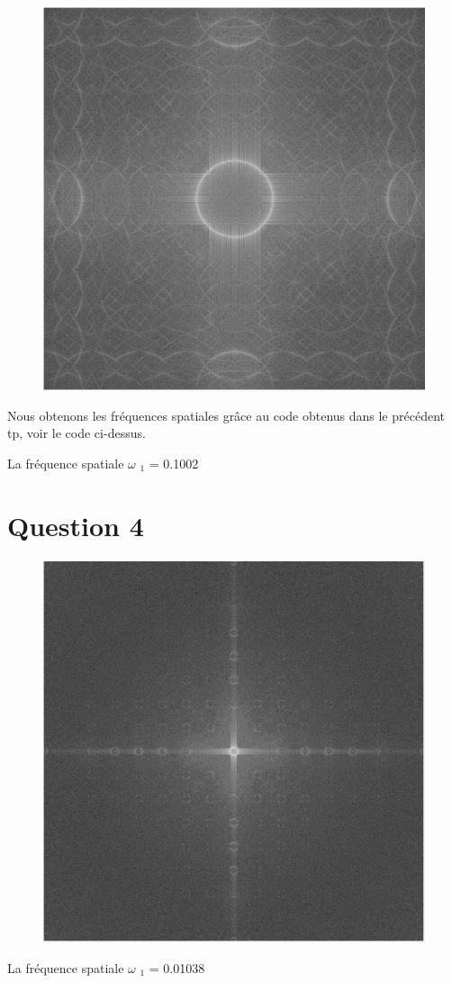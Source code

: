 \documentclass[a4paper,12pt]{report}
\begin{document}
\begin{figure}[!ht]
	\center	
		\includegraphics[scale=0.1]{image/q3.png}		
\end{figure}
Nous obtenons les fréquences spatiales grâce au code obtenus dans le précédent tp, voir le code ci-dessus.

La fréquence spatiale $\omega$ $_{1}$ = 0.1002

\newpage

\section*{Question 4}

\begin{figure}[!ht]
	\center	
		\includegraphics[scale=0.1]{image/Q4.png}	
\end{figure}
La fréquence spatiale $\omega$ $_{1}$ = 0.01038
\end{document}
